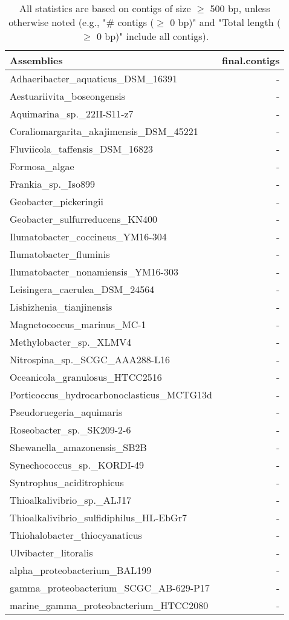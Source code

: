 \documentclass[12pt,a4paper]{article}
\begin{document}
\begin{table}[ht]
\begin{center}
\caption{All statistics are based on contigs of size $\geq$ 500 bp, unless otherwise noted (e.g., "\# contigs ($\geq$ 0 bp)" and "Total length ($\geq$ 0 bp)" include all contigs).}
\begin{tabular}{|l*{1}{|r}|}
\hline
Assemblies & final.contigs \\ \hline
Adhaeribacter\_aquaticus\_DSM\_16391 & - \\ \hline
Aestuariivita\_boseongensis & - \\ \hline
Aquimarina\_sp.\_22II-S11-z7 & - \\ \hline
Coraliomargarita\_akajimensis\_DSM\_45221 & - \\ \hline
Fluviicola\_taffensis\_DSM\_16823 & - \\ \hline
Formosa\_algae & - \\ \hline
Frankia\_sp.\_Iso899 & - \\ \hline
Geobacter\_pickeringii & - \\ \hline
Geobacter\_sulfurreducens\_KN400 & - \\ \hline
Ilumatobacter\_coccineus\_YM16-304 & - \\ \hline
Ilumatobacter\_fluminis & - \\ \hline
Ilumatobacter\_nonamiensis\_YM16-303 & - \\ \hline
Leisingera\_caerulea\_DSM\_24564 & - \\ \hline
Lishizhenia\_tianjinensis & - \\ \hline
Magnetococcus\_marinus\_MC-1 & - \\ \hline
Methylobacter\_sp.\_XLMV4 & - \\ \hline
Nitrospina\_sp.\_SCGC\_AAA288-L16 & - \\ \hline
Oceanicola\_granulosus\_HTCC2516 & - \\ \hline
Porticoccus\_hydrocarbonoclasticus\_MCTG13d & - \\ \hline
Pseudoruegeria\_aquimaris & - \\ \hline
Roseobacter\_sp.\_SK209-2-6 & - \\ \hline
Shewanella\_amazonensis\_SB2B & - \\ \hline
Synechococcus\_sp.\_KORDI-49 & - \\ \hline
Syntrophus\_aciditrophicus & - \\ \hline
Thioalkalivibrio\_sp.\_ALJ17 & - \\ \hline
Thioalkalivibrio\_sulfidiphilus\_HL-EbGr7 & - \\ \hline
Thiohalobacter\_thiocyanaticus & - \\ \hline
Ulvibacter\_litoralis & - \\ \hline
alpha\_proteobacterium\_BAL199 & - \\ \hline
gamma\_proteobacterium\_SCGC\_AB-629-P17 & - \\ \hline
marine\_gamma\_proteobacterium\_HTCC2080 & - \\ \hline
\end{tabular}
\end{center}
\end{table}
\end{document}
